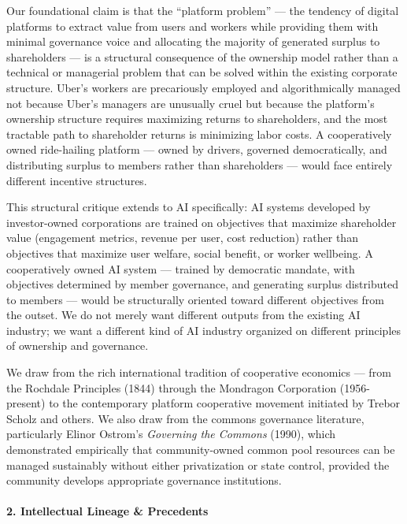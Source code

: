 Our foundational claim is that the ``platform problem'' --- the tendency
of digital platforms to extract value from users and workers while
providing them with minimal governance voice and allocating the majority
of generated surplus to shareholders --- is a structural consequence of
the ownership model rather than a technical or managerial problem that
can be solved within the existing corporate structure. Uber's workers
are precariously employed and algorithmically managed not because Uber's
managers are unusually cruel but because the platform's ownership
structure requires maximizing returns to shareholders, and the most
tractable path to shareholder returns is minimizing labor costs. A
cooperatively owned ride-hailing platform --- owned by drivers, governed
democratically, and distributing surplus to members rather than
shareholders --- would face entirely different incentive structures.

This structural critique extends to AI specifically: AI systems
developed by investor-owned corporations are trained on objectives that
maximize shareholder value (engagement metrics, revenue per user, cost
reduction) rather than objectives that maximize user welfare, social
benefit, or worker wellbeing. A cooperatively owned AI system ---
trained by democratic mandate, with objectives determined by member
governance, and generating surplus distributed to members --- would be
structurally oriented toward different objectives from the outset. We do
not merely want different outputs from the existing AI industry; we want
a different kind of AI industry organized on different principles of
ownership and governance.

We draw from the rich international tradition of cooperative economics
--- from the Rochdale Principles (1844) through the Mondragon
Corporation (1956-present) to the contemporary platform cooperative
movement initiated by Trebor Scholz and others. We also draw from the
commons governance literature, particularly Elinor Ostrom's
\emph{Governing the Commons} (1990), which demonstrated empirically that
community-owned common pool resources can be managed sustainably without
either privatization or state control, provided the community develops
appropriate governance institutions.

\paragraph{2. Intellectual Lineage \&
Precedents}\label{intellectual-lineage-precedents-30}

